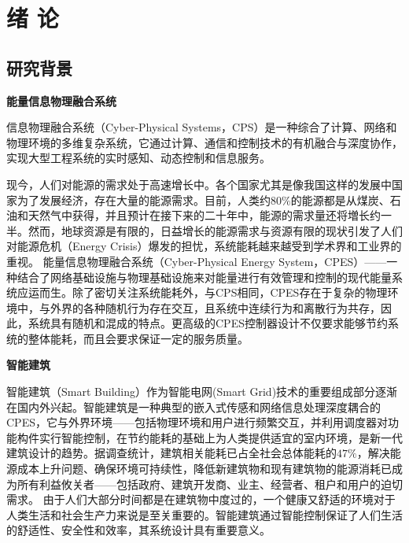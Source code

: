 \chapter{绪\hskip 0.4cm 论}
\label{chap1}
\section{研究背景}
	\textbf{能量信息物理融合系统}
	
	信息物理融合系统（Cyber-Physical Systems，CPS）\citep{谭朋柳2017面向医疗的,lee2011introduction}是一种综合了计算、网络和物理环境的多维复杂系统，它通过计算、通信和控制技术的有机融合与深度协作，实现大型工程系统的实时感知、动态控制和信息服务。
	
	现今，人们对能源的需求处于高速增长中。各个国家尤其是像我国这样的发展中国家为了发展经济，存在大量的能源需求。目前，人类约$80\%$的能源都是从煤炭、石油和天然气中获得，并且预计在接下来的二十年中，能源的需求量还将増长约一半。然而，地球资源是有限的，日益增长的能源需求与资源有限的现状引发了人们对能源危机（Energy Crisis）爆发的担忧，系统能耗越来越受到学术界和工业界的重视。
	能量信息物理融合系统（Cyber-Physical Energy System，CPES）\citep{Van2017Cyber,DBLP:journals/corr/StamatescuSACF16}——一种结合了网络基础设施与物理基础设施来对能量进行有效管理和控制的现代能量系统应运而生。除了密切关注系统能耗外，与CPS相同，CPES存在于复杂的物理环境中，与外界的各种随机行为存在交互，且系统中连续行为和离散行为共存，因此，系统具有随机和混成的特点。更高级的CPES控制器设计不仅要求能够节约系统的整体能耗，而且会要求保证一定的服务质量\citep{DBLP:conf/compsac/ChenGCDLS15}。
	
	\textbf{智能建筑}
	
	智能建筑（Smart Building）\citep{Kleissl2010Cyber,DBLP:conf/wsc/OckIF16}作为智能电网(Smart Grid)技术\citep{Jacobsen2015Smart}的重要组成部分逐渐在国内外兴起。智能建筑是一种典型的嵌入式传感和网络信息处理深度耦合的CPES，它与外界环境——包括物理环境和用户进行频繁交互，并利用调度器对功能构件实行智能控制，在节约能耗的基础上为人类提供适宜的室内环境，是新一代建筑设计的趋势。据调查统计，建筑相关能耗已占全社会总体能耗的$47\%$\citep{DBLP:conf/smartgreens/LiTTYW17}，解决能源成本上升问题、确保环境可持续性，降低新建筑物和现有建筑物的能源消耗已成为所有利益攸关者——包括政府、建筑开发商、业主、经营者、租户和用户的迫切需求。
	由于人们大部分时间都是在建筑物中度过的，一个健康又舒适的环境对于人类生活和社会生产力来说是至关重要的。智能建筑通过智能控制保证了人们生活的舒适性、安全性和效率，其系统设计具有重要意义。
	
